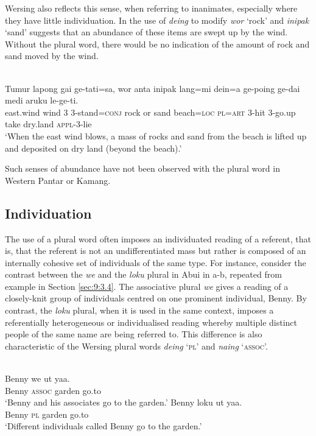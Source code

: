 Wersing also reflects this sense, when referring to inanimates, especially where they have little individuation. In  the use of \textit{deing} to modify \textit{wor} `rock' and \textit{inipak} `sand' suggests that an abundance of these items are swept up by the wind. Without the plural word, there would be no indication of the amount of rock and sand moved by the wind.


\ea%
\label{ex:9:75}
 \\
\gll  Tumur lapong gai ge-tati=sa, wor anta inipak lang=mi dein=a ge-poing ge-dai medi aruku le-ge-ti.   \\
  east.wind wind 3 3-stand=\textsc{conj} rock or sand beach=\textsc{loc}   \textsc{pl=art} \textsc{3-}hit 3-go.up take dry.land \textsc{appl-3-}lie \\
\glt `When the east wind blows, a mass of rocks and sand from the beach is lifted up and deposited on dry land (beyond the beach).'
\z










Such senses of abundance have not been observed with the plural word in Western Pantar or Kamang.

\subsection{Individuation} %
\label{sec:9:4.3}
The use of a plural word often imposes an individuated reading of a referent, that is, that the referent is not an undifferentiated mass but rather is composed of an internally cohesive set of individuals of the same type. For instance, consider the contrast between the \textit{we} and the \textit{loku} plural in Abui in a-b, repeated from example  in Section \ref{sec:9:3.4}. The associative plural \textit{we} gives a reading of a closely-knit group of individuals centred on one prominent individual, Benny. By contrast, the \textit{loku} plural, when it is used in the same context, imposes a referentially heterogeneous or individualised reading whereby multiple distinct people of the same name are being referred to. This difference is also characteristic of the Wersing plural words \textit{deing} `\textsc{pl}' and \textit{naing} `\textsc{assoc}'.


\ea%
\label{ex:9:76}
 \\
\ea
\gll Benny w{e} ut yaa. \\
   Benny \textsc{assoc} garden go.to \\
\glt `Benny and his associates go to the garden.'
\ex
\gll Benny loku ut yaa.\\
  Benny \textsc{pl} garden go.to  \\
\glt  `Different individuals called Benny go to the garden.'
\z
\z






